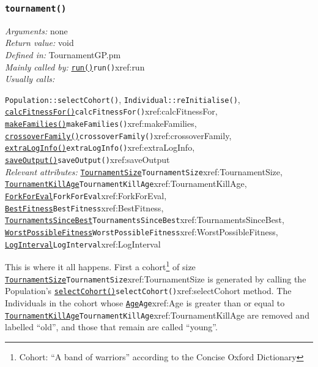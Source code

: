 \documentclass[a4paper]{article}
\begin{document}
\subsubsection{\texttt{tournament()}}\label{xref:tournament}
\begin{flushleft}
\textit{Arguments:} none\\
\textit{Return value:} void\\
\textit{Defined in:} TournamentGP.pm\\
\textit{Mainly called by:} \hyperref[no]{\texttt{run()}}{\texttt{run()}}{xref:run}\\
\textit{Usually calls:} \raggedright\texttt{Population::selectCohort()}, \texttt{Individual::reInitialise()}, \hyperref[no]{\texttt{calcFitnessFor()}}{\texttt{calcFitnessFor()}}{xref:calcFitnessFor}, \hyperref[no]{\texttt{makeFamilies()}}{\texttt{makeFamilies()}}{xref:makeFamilies}, \hyperref[no]{\texttt{crossoverFamily()}}{\texttt{crossoverFamily()}}{xref:crossoverFamily}, \hyperref[no]{\texttt{extraLogInfo()}}{\texttt{extraLogInfo()}}{xref:extraLogInfo}, \hyperref[no]{\texttt{saveOutput()}}{\texttt{saveOutput()}}{xref:saveOutput} \\
\textit{Relevant attributes:} \hyperref[no]{\texttt{TournamentSize}}{\texttt{TournamentSize}}{xref:TournamentSize}, \hyperref[no]{\texttt{TournamentKillAge}}{\texttt{TournamentKillAge}}{xref:TournamentKillAge}, \hyperref[no]{\texttt{ForkForEval}}{\texttt{ForkForEval}}{xref:ForkForEval}, \hyperref[no]{\texttt{BestFitness}}{\texttt{BestFitness}}{xref:BestFitness}, \hyperref[no]{\texttt{TournamentsSinceBest}}{\texttt{TournamentsSinceBest}}{xref:TournamentsSinceBest}, \hyperref[no]{\texttt{WorstPossibleFitness}}{\texttt{WorstPossibleFitness}}{xref:WorstPossibleFitness}, \hyperref[no]{\texttt{LogInterval}}{\texttt{LogInterval}}{xref:LogInterval}
\end{flushleft}

This is where it all happens.  First a cohort\footnote{Cohort: ``A
band of warriors'' according to the Concise Oxford Dictionary} of size
\hyperref[no]{\texttt{TournamentSize}}{\texttt{TournamentSize}}{xref:TournamentSize} is generated by calling the Population's
\hyperref[no]{\texttt{selectCohort()}}{\texttt{selectCohort()}}{xref:selectCohort} method.  The Individuals in the cohort whose
\hyperref[no]{\texttt{Age}}{\texttt{Age}}{xref:Age} is greater than or equal to \hyperref[no]{\texttt{TournamentKillAge}}{\texttt{TournamentKillAge}}{xref:TournamentKillAge}
are removed and labelled ``old'', and those that remain are called
``young''.
\end{document}
